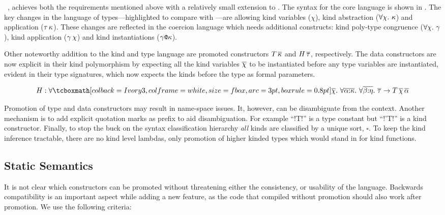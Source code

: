 \documentclass[screen,nonacm,manuscript,review]{acmart} %
\begin{document}
\SFP~\cite{yorgey_giving_2012}, achieves both the requirements mentioned above with a relatively small extension to \SFC. The syntax for the core language is shown in . The key changes in the language of types---highlighted to compare with \SFC---are allowing kind variables ($\chi$), kind abstraction ($\forall\chi.~\kappa$) and application ($\tau\, \kappa$). These changes are reflected in the coercion language which needs additional constructs: kind poly-type congruence ($\forall\chi.~\gamma$), kind application ($\gamma\,\chi$) and kind instantiations ($\gamma\texttt{@}\kappa$).

Other noteworthy addition to the kind and type language are promoted constructors $T\,\overline{\kappa}$ and $H\,\overline{\tau}$, respectively. The data constructors are now explicit in their kind polymorphism by expecting all the kind variables $\overline{\chi}$ to be instantiated before any type variables are instantiated, evident in their type signatures, which now expects the kinds before the type as formal parameters.

$$
H : \Forall {\shl{\many\chi}} {\Forall {\many{\TyVar\co\kappa}}
  {\Forall {\many{\beta\co\eta}} {\many\tau \to T
      \App\many{\chi}\App\many{\TyVar}}}}
$$

Promotion of type and data constructors may result in name-space issues. It, however, can be disambiguate from the context. Another mechanism is to add explicit quotation marks as prefix to aid disambiguation.
For example ``!T!'' is a type constant but ``!'T!'' is a kind constructor.
Finally, to stop the buck on the syntax classification hierarchy \emph{all} kinds are classified by a unique sort, $\square$. To keep the kind inference tractable, there are no kind level lambdas, only promotion of higher kinded types which would stand in for kind functions.

\subsection{Static Semantics}
It is not clear which constructors can be promoted without threatening
either the consistency, or usability of the language. Backwards
compatibility is an important aspect while adding a new feature, as
the code that compiled without promotion should also work after
promotion. We use the following criteria:
\end{document}
